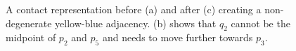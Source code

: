 \begin{figure}[H]
	\centering
	\quad
	\quad
	\caption{A contact representation before (a) and after (c) creating a non-degenerate yellow-blue adjacency. (b) shows that $q_2$ cannot be the midpoint of $p_2$ and $p_5$ and needs to move further towards $p_3$.}
	\label{fig:flip-internal-edge-expand}
\end{figure}
